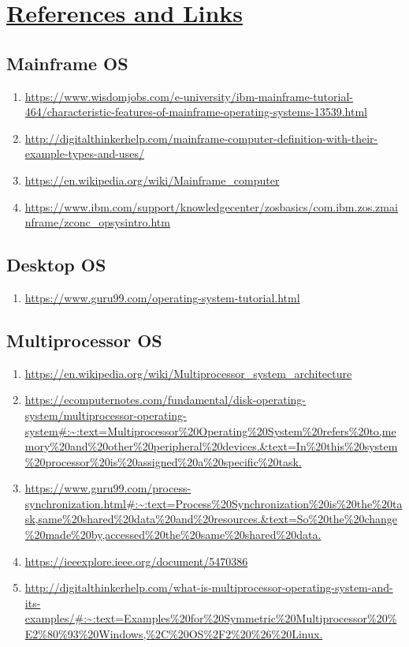\documentclass{article}
\begin{document}
\section{\underline{References and Links}}
\subsection{Mainframe OS}
\begin{enumerate}
    \item \url{https://www.wisdomjobs.com/e-university/ibm-mainframe-tutorial-464/characteristic-features-of-mainframe-operating-systems-13539.html}
    \item \url{http://digitalthinkerhelp.com/mainframe-computer-definition-with-their-example-types-and-uses/}
    \item \url{https://en.wikipedia.org/wiki/Mainframe_computer}
    \item \url{https://www.ibm.com/support/knowledgecenter/zosbasics/com.ibm.zos.zmainframe/zconc_opsysintro.htm}
\end{enumerate}
\subsection{Desktop OS}
\begin{enumerate}
    \item \url{https://www.guru99.com/operating-system-tutorial.html}
\end{enumerate}
\subsection{Multiprocessor OS}
\begin{enumerate}
    \item \url{https://en.wikipedia.org/wiki/Multiprocessor_system_architecture}
    \item \url{https://ecomputernotes.com/fundamental/disk-operating-system/multiprocessor-operating-system#:~:text=Multiprocessor%20Operating%20System%20refers%20to,memory%20and%20other%20peripheral%20devices.&text=In%20this%20system%20processor%20is%20assigned%20a%20specific%20task.}
    \item \url{https://www.guru99.com/process-synchronization.html#:~:text=Process%20Synchronization%20is%20the%20task,same%20shared%20data%20and%20resources.&text=So%20the%20change%20made%20by,accessed%20the%20same%20shared%20data.}
    \item \url{ https://ieeexplore.ieee.org/document/5470386}
    \item \url{http://digitalthinkerhelp.com/what-is-multiprocessor-operating-system-and-its-examples/#:~:text=Examples%20for%20Symmetric%20Multiprocessor%20%E2%80%93%20Windows,%2C%20OS%2F2%20%26%20Linux.}
\end{enumerate}
\end{document}
